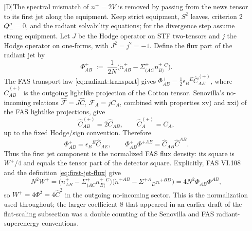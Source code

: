 \documentclass[11pt,a4paper]{article}
\newcommand{\cF}{\mathcal{F}}
\newcommand{\statusD}{\textsf{[D]}}
\begin{document}
\statusD The spectral mismatch of \(n^+=2V\) is removed by passing from the news tensor to its first jet along the equipment.  Keep strict equipment, \(S^2\) leaves, criterion 2 \(Q_-^\mu=0\), and the radiant solvability equations; for the divergence step assume strong equipment.  Let \(J\) be the Hodge operator on STF two-tensors and \(j\) the Hodge operator on one-forms, with \(J^2=j^2=-1\).  Define the flux part of the radiant jet by
\begin{equation}\label{eq:first-jet-flux}
  \Phi^+_{AB}
  \;:=\;
  \frac{1}{2N}
  \Big(
  \dot n^+_{AB}
  -
  \Sigma^+_{(AC}n^+_{B)}{}^C
  \Big) .
\end{equation}
The FAS transport law \eqref{eq:radiant-transport} gives
\(\Phi^+_{AB}=\tfrac12\epsilon_B{}^E\hat C^{(+)}_{AE}\), where \(\hat C^{(+)}_{AB}\) is the outgoing lightlike projection of the Cotton tensor.  Senovilla's no-incoming relations \(\hat{\cF}=J\hat C\), \(\cF_A=jC_A\), combined with properties xv) and xxi) of the FAS lightlike projections, give
\begin{equation}\label{eq:outgoing-cotton-projections}
  \hat C^{(+)}_{AB}=2\hat C_{AB},
  \qquad
  \hat C^{(+)}_A=C_A ,
\end{equation}
up to the fixed Hodge/sign convention.  Therefore
\begin{equation}\label{eq:first-jet-flux-detector}
  \Phi^+_{AB}
  =
  \epsilon_B{}^E\hat C_{AE},
  \qquad
  \Phi^+_{AB}\Phi^{+AB}
  =
  \hat C_{AB}\hat C^{AB} .
\end{equation}
Thus the first jet component is the normalized FAS flux density: its square is \(W^+/4\) and equals the tensor part of the detector square.  Explicitly, FAS VI.108 and the definition \eqref{eq:first-jet-flux} give
\begin{equation}\label{eq:W-phi-normalization}
  N^2W^+
  =
  \big(\dot n^+_{AB}-\Sigma^+_{(AC}n^+_{B)}{}^C\big)
  \big(\dot n^{+AB}-\Sigma^{+A}{}_{D}n^{+BD}\big)
  =
  4N^2\Phi_{AB}\Phi^{AB},
\end{equation}
so \(W^+=4\Phi^2=4\hat C^2\) in the outgoing no-incoming sector.  This is the normalization used throughout; the larger coefficient \(8\) that appeared in an earlier draft of the flat-scaling subsection was a double counting of the Senovilla and FAS radiant-superenergy conventions.
\end{document}
